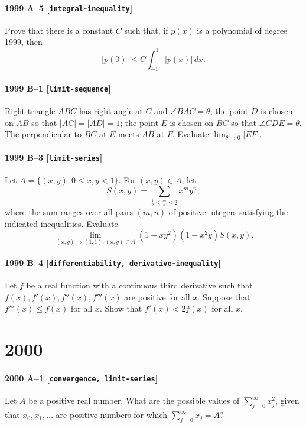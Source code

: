 \documentclass[11pt]{article}
\begin{document}
\paragraph{1999 A--5 \textnormal{[\texttt{integral-inequality}]}}
Prove that there is a constant $C$ such that, if $p(x)$ is a polynomial
of degree 1999, then
\[|p(0)|\leq C \int_{-1}^1 |p(x)|\,dx.\]

\paragraph{1999 B--1 \textnormal{[\texttt{limit-sequence}]}}
Right triangle $ABC$ has right angle at $C$ and $\angle BAC =\theta$;
the point $D$ is chosen on $AB$ so that $|AC|=|AD|=1$; the point $E$
is chosen on $BC$ so that $\angle CDE = \theta$. The perpendicular
to $BC$ at $E$ meets $AB$ at $F$. Evaluate $\lim_{\theta\rightarrow 0}
|EF|$.

\paragraph{1999 B--3 \textnormal{[\texttt{limit-series}]}}
Let $A=\{(x,y):0\leq x,y<1\}$. For $(x,y)\in A$, let
\[S(x,y) = \sum_{\frac{1}{2}\leq \frac{m}{n}\leq 2} x^m y^n,\]
where the sum ranges over all pairs $(m,n)$ of positive integers
satisfying the indicated inequalities. Evaluate
\[\lim_{(x,y)\rightarrow (1,1), (x,y)\in A} (1-xy^2)(1-x^2y)S(x,y).\]

\paragraph{1999 B--4 \textnormal{[\texttt{differentiability, derivative-inequality}]}}
Let $f$ be a real function with a continuous third derivative such that $f(x),
f'(x), f''(x), f'''(x)$ are positive for all $x$. Suppose that
$f'''(x)\leq f(x)$ for all $x$. Show that $f'(x)<2f(x)$ for all $x$.

\section*{2000}

\paragraph{2000 A--1 \textnormal{[\texttt{convergence, limit-series}]}}
Let $A$ be a positive real number. What are the possible values of
$\sum_{j=0}^\infty x_j^2$, given that $x_0,x_1,\ldots$ are positive
numbers
for which $\sum_{j=0}^\infty x_j=A$?
\end{document}
